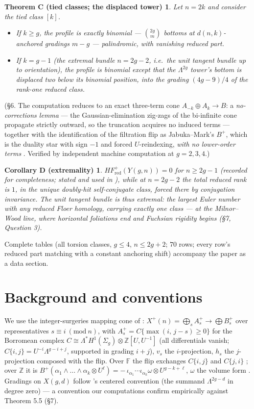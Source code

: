 \documentclass[11pt,reqno]{amsart}
\newcommand{\F}{\mathbb{F}}
\newcommand{\Z}{\mathbb{Z}}
\newcommand{\HFred}{\mathit{HF}^{+}_{\mathrm{red}}}
\newcommand{\Sig}{\Sigma}
\newcommand{\Lam}{\Lambda}
\newcommand{\Ymg}{Y(g,n)}
\theoremstyle{plain}
\newtheorem*{thmC}{Theorem C (tied classes; the displaced tower)}
\newtheorem*{corD}{Corollary D (extremality)}
\begin{document}
\begin{thmC}
Let $n=2k$ and consider the tied class $[k]$.
\begin{itemize}
 \item[(i)] If $k\ge g$, the profile is exactly binomial --- $\binom{2g}{m}$ bottoms at $d(n,k)$-anchored gradings $m-g$ --- palindromic, with vanishing reduced part.
 \item[(ii)] If $k=g-1$ (the extremal bundle $n=2g-2$, i.e.\ the unit tangent bundle up to orientation), the profile is binomial except that the $\Lam^{2g}$ tower's bottom is displaced two below its binomial position, into the grading $(4g-9)/4$ of the rank-one reduced class.
\end{itemize}
\end{thmC}
\noindent(\S6. The computation reduces to an exact three-term cone $A_{-k}\oplus A_k\to B$: a \emph{no-corrections lemma} --- the Gaussian-elimination zig-zags of the bi-infinite cone propagate strictly outward, so the truncation acquires no induced terms --- together with the identification of the filtration flip as Jabuka--Mark's $B^{+}$, which is the duality star with sign $-1$ and forced $U$-reindexing, \emph{with no lower-order terms} \cite[Lemmas 3.1, 3.2, 3.5]{JM}. Verified by independent machine computation at $g=2,3,4$.)

\begin{corD}
$\HFred(\Ymg)=0$ for $n\ge 2g-1$ (recorded for completeness; stated and used in \cite{MT}), while at $n=2g-2$ the total reduced rank is $1$, in the unique doubly-hit self-conjugate class, forced there by conjugation invariance. The unit tangent bundle is thus extremal: the largest Euler number with any reduced Floer homology, carrying exactly one class --- at the Milnor--Wood line, where horizontal foliations end and Fuchsian rigidity begins (\S7, Question 3).
\end{corD}

Complete tables (all torsion classes, $g\le 4$, $n\le 2g+2$; $70$ rows; every row's reduced part matching \cite[Thm~5.6]{OS08} with a constant anchoring shift) accompany the paper as a data section.

\section{Background and conventions}

We use the integer-surgeries mapping cone of \cite{OS08}: $X^{+}(n)=\bigoplus_s A_s^{+}\to\bigoplus B_s^{+}$ over representatives $s\equiv i\ (\mathrm{mod}\ n)$, with $A_s^{+}=C\{\max(i,\,j-s)\ge 0\}$ for the Borromean complex $C\cong \Lam^{*}H^1(\Sig_g)\otimes \Z[U,U^{-1}]$ (all differentials vanish; $C\{i,j\}=U^{-i}\Lam^{g-i+j}$, supported in grading $i+j$), $v_s$ the $i$-projection, $h_s$ the $j$-projection composed with the flip. Over $\F$ the flip exchanges $C\{i,j\}$ and $C\{j,i\}$ \cite[Prop 5.2]{OS08}; over $\Z$ it is $B^{+}(\alpha_1\wedge\dots\wedge\alpha_k\otimes U^{\ell})=-\,\iota_{\alpha_1}\cdots\iota_{\alpha_k}\omega\otimes U^{g-k+\ell}$, $\omega$ the volume form \cite{JM}. Gradings on $X(g,d)$ follow \cite{OS08}'s centered convention (the summand $\Lam^{2g-d}$ in degree zero) --- a convention our computations confirm empirically against Theorem 5.5 (\S7).
\end{document}
